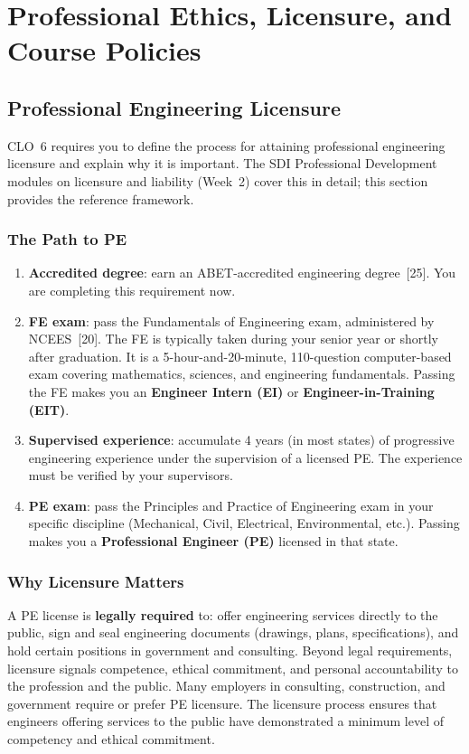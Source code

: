\chapter{Professional Ethics, Licensure, and Course Policies}

\section{Professional Engineering Licensure}
CLO~6 requires you to define the process for attaining professional engineering licensure and explain why it is important. The SDI Professional Development modules on licensure and liability (Week~2) cover this in detail; this section provides the reference framework.

\subsection{The Path to PE}
\begin{enumerate}[nosep,leftmargin=1.5em]
\item \textbf{Accredited degree}: earn an ABET-accredited engineering degree~[25]. You are completing this requirement now.
\item \textbf{FE exam}: pass the Fundamentals of Engineering exam, administered by NCEES~[20]. The FE is typically taken during your senior year or shortly after graduation. It is a 5-hour-and-20-minute, 110-question computer-based exam covering mathematics, sciences, and engineering fundamentals. Passing the FE makes you an \textbf{Engineer Intern (EI)} or \textbf{Engineer-in-Training (EIT)}.
\item \textbf{Supervised experience}: accumulate 4 years (in most states) of progressive engineering experience under the supervision of a licensed PE. The experience must be verified by your supervisors.
\item \textbf{PE exam}: pass the Principles and Practice of Engineering exam in your specific discipline (Mechanical, Civil, Electrical, Environmental, etc.). Passing makes you a \textbf{Professional Engineer (PE)} licensed in that state.
\end{enumerate}

\subsection{Why Licensure Matters}
A PE license is \textbf{legally required} to: offer engineering services directly to the public, sign and seal engineering documents (drawings, plans, specifications), and hold certain positions in government and consulting. Beyond legal requirements, licensure signals competence, ethical commitment, and personal accountability to the profession and the public. Many employers in consulting, construction, and government require or prefer PE licensure. The licensure process ensures that engineers offering services to the public have demonstrated a minimum level of competency and ethical commitment.

